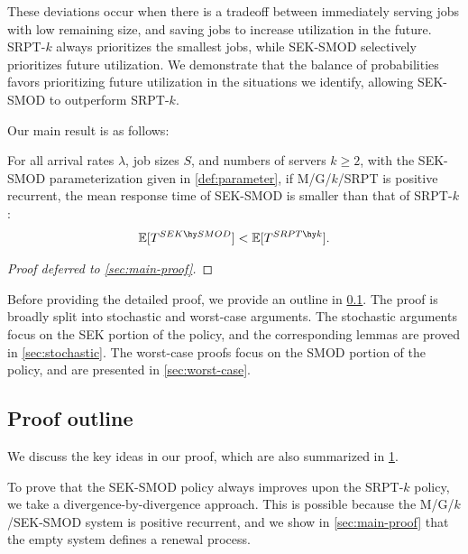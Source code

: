 \documentclass[acmsmall]{acmart}
\newcommand{\E}[1]{\mathbb{E}[#1]}
\begin{document}
These deviations occur when there is a tradeoff between immediately serving jobs with low remaining size, and saving jobs to increase utilization in the future. SRPT-$k$ always prioritizes the smallest jobs, while SEK-SMOD selectively prioritizes future utilization. We demonstrate that the balance of probabilities favors prioritizing future utilization in the situations we identify, allowing SEK-SMOD to outperform SRPT-$k$.

Our main result is as follows:

\begin{theorem}
    \label{thm:main}
    For all arrival rates $\lambda$, job sizes $S$, and numbers of servers $k\geq 2$,
    with the SEK-SMOD parameterization given in \cref{def:parameter},
    if M/G/$k$/SRPT is positive recurrent,
    the mean response time of SEK-SMOD is smaller than that of SRPT-$k$:
    \begin{align*}
        \E{T^{SEK \hy SMOD}} < \E{T^{SRPT \hy k}}. 
    \end{align*}
\end{theorem}
\begin{proof}[Proof deferred to \cref{sec:main-proof}]
\end{proof}


Before providing the detailed proof, we provide an outline in \cref{sec:proof-outline}. The proof is broadly split into stochastic and worst-case arguments. The stochastic arguments focus on the SEK portion of the policy, and the corresponding lemmas are proved in \cref{sec:stochastic}. The worst-case proofs focus on the SMOD portion of the policy, and are presented in \cref{sec:worst-case}.

\subsection{Proof outline}
\label{sec:proof-outline}


We discuss the key ideas in our proof, which are also summarized in \cref{diagram:thm-proof}.

\begin{figure}[omitted: a diagram of this paper's results, not reproduced here]\label{diagram:thm-proof}\end{figure}


To prove that the SEK-SMOD policy always improves upon the SRPT-$k$ policy, we take a divergence-by-divergence approach. This is possible because the M/G/$k$/SEK-SMOD system is positive recurrent, and we show in \cref{sec:main-proof} that the empty system defines a renewal process. 
\end{document}
